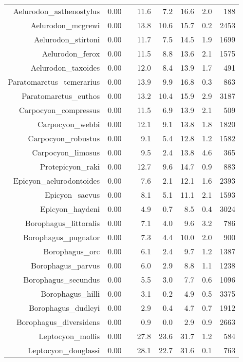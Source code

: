 \begin{table}[ht]
\begin{tabular}{rrrrrrrr}
  Aelurodon\_asthenostylus & 0.00 &  & 11.6 & 7.2 & 16.6 & 2.0 & 188 \\ 
  Aelurodon\_mcgrewi & 0.00 &  & 13.8 & 10.6 & 15.7 & 0.2 & 2453 \\ 
  Aelurodon\_stirtoni & 0.00 &  & 11.7 & 7.5 & 14.5 & 1.9 & 1699 \\ 
  Aelurodon\_ferox & 0.00 &  & 11.5 & 8.8 & 13.6 & 2.1 & 1575 \\ 
  Aelurodon\_taxoides & 0.00 &  & 12.0 & 8.4 & 13.9 & 1.7 & 491 \\ 
  Paratomarctus\_temerarius & 0.00 &  & 13.9 & 9.9 & 16.8 & 0.3 & 863 \\ 
  Paratomarctus\_euthos & 0.00 &  & 13.2 & 10.4 & 15.9 & 2.9 & 3187 \\ 
  Carpocyon\_compressus & 0.00 &  & 11.5 & 6.9 & 13.9 & 2.1 & 509 \\ 
  Carpocyon\_webbi & 0.00 &  & 12.1 & 9.1 & 13.8 & 1.8 & 1820 \\ 
  Carpocyon\_robustus & 0.00 &  & 9.1 & 5.4 & 12.8 & 1.2 & 1582 \\ 
  Carpocyon\_limosus & 0.00 &  & 9.5 & 2.4 & 13.8 & 4.6 & 365 \\ 
  Protepicyon\_raki & 0.00 &  & 12.7 & 9.6 & 14.7 & 0.9 & 883 \\ 
  Epicyon\_aelurodontoides & 0.00 &  & 7.6 & 2.1 & 12.1 & 1.6 & 2393 \\ 
  Epicyon\_saevus & 0.00 &  & 8.1 & 5.1 & 11.1 & 2.1 & 1593 \\ 
  Epicyon\_haydeni & 0.00 &  & 4.9 & 0.7 & 8.5 & 0.4 & 3024 \\ 
  Borophagus\_littoralis & 0.00 &  & 7.1 & 4.0 & 9.6 & 3.2 & 786 \\ 
  Borophagus\_pugnator & 0.00 &  & 7.3 & 4.4 & 10.0 & 2.0 & 900 \\ 
  Borophagus\_orc & 0.00 &  & 6.1 & 2.4 & 9.7 & 1.2 & 1387 \\ 
  Borophagus\_parvus & 0.00 &  & 6.0 & 2.9 & 8.8 & 1.1 & 1238 \\ 
  Borophagus\_secundus & 0.00 &  & 5.5 & 3.0 & 7.7 & 0.6 & 1096 \\ 
  Borophagus\_hilli & 0.00 &  & 3.1 & 0.2 & 4.9 & 0.5 & 3375 \\ 
  Borophagus\_dudleyi & 0.00 &  & 2.9 & 0.4 & 4.7 & 0.7 & 1912 \\ 
  Borophagus\_diversidens & 0.00 &  & 0.9 & 0.0 & 2.9 & 0.9 & 2663 \\ 
  Leptocyon\_mollis & 0.00 &  & 27.8 & 23.6 & 31.7 & 1.2 & 584 \\ 
  Leptocyon\_douglassi & 0.00 &  & 28.1 & 22.7 & 31.6 & 0.1 & 763 \\ 

\end{tabular}
\end{table}
